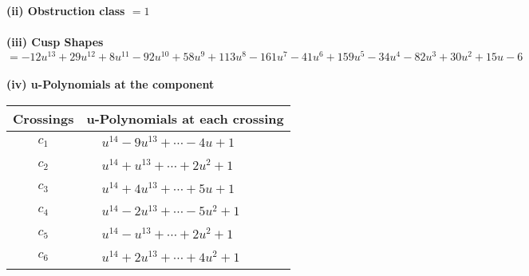 \documentclass[1p]{elsarticle_modified}
\theoremstyle{definition}
\begin{document}
\flushleft \textbf{(ii) Obstruction class $= 1$}\\~\\
\flushleft \textbf{(iii) Cusp Shapes $= -12 u^{13}+29 u^{12}+8 u^{11}-92 u^{10}+58 u^9+113 u^8-161 u^7-41 u^6+159 u^5-34 u^4-82 u^3+30 u^2+15 u-6$}\\~\\
\newpage\renewcommand{\arraystretch}{1}
\flushleft \textbf{(iv) u-Polynomials at the component}\newline \\
\begin{tabular}{m{50pt}|m{274pt}}
Crossings & \hspace{64pt}u-Polynomials at each crossing \\
\hline $$\begin{aligned}c_{1}\end{aligned}$$&$\begin{aligned}
&u^{14}-9 u^{13}+\cdots-4 u+1
\end{aligned}$\\
\hline $$\begin{aligned}c_{2}\end{aligned}$$&$\begin{aligned}
&u^{14}+u^{13}+\cdots+2 u^2+1
\end{aligned}$\\
\hline $$\begin{aligned}c_{3}\end{aligned}$$&$\begin{aligned}
&u^{14}+4 u^{13}+\cdots+5 u+1
\end{aligned}$\\
\hline $$\begin{aligned}c_{4}\end{aligned}$$&$\begin{aligned}
&u^{14}-2 u^{13}+\cdots-5 u^2+1
\end{aligned}$\\
\hline $$\begin{aligned}c_{5}\end{aligned}$$&$\begin{aligned}
&u^{14}- u^{13}+\cdots+2 u^2+1
\end{aligned}$\\
\hline $$\begin{aligned}c_{6}\end{aligned}$$&$\begin{aligned}
&u^{14}+2 u^{13}+\cdots+4 u^2+1
\end{aligned}$\\

\end{tabular}
\end{document}
